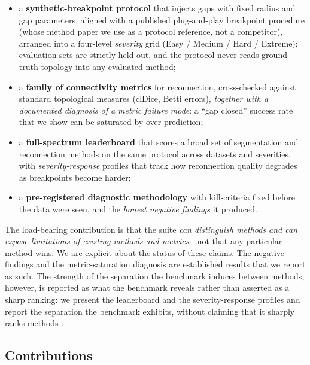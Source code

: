 \begin{itemize}
  \item a \textbf{synthetic-breakpoint protocol} that injects gaps with
        fixed radius and gap parameters, aligned with a published
        plug-and-play breakpoint procedure \cite{TODO_creatis} (whose method
        paper we use as a protocol reference, not a competitor), arranged
        into a four-level \emph{severity} grid (Easy / Medium / Hard /
        Extreme); evaluation sets are strictly held out, and the protocol
        never reads ground-truth topology into any evaluated method;
  \item a \textbf{family of connectivity metrics} for reconnection,
        cross-checked against standard topological measures (clDice, Betti
        errors), \emph{together with a documented diagnosis of a metric
        failure mode}: a ``gap closed'' success rate that we show can be
        saturated by over-prediction;
  \item a \textbf{full-spectrum leaderboard} that scores a broad set of
        segmentation and reconnection methods on the same protocol across
        datasets and severities, with \emph{severity-response} profiles that
        track how reconnection quality degrades as breakpoints become harder;
  \item a \textbf{pre-registered diagnostic methodology} with kill-criteria
        fixed before the data were seen, and the \emph{honest negative
        findings} it produced.
\end{itemize}

The load-bearing contribution is that the suite \emph{can distinguish methods
and can expose limitations of existing methods and metrics}---not that any
particular method wins. We are explicit about the status of these claims.
The negative findings and the metric-saturation diagnosis are established
results that we report as such. The strength of the separation the
benchmark induces between methods, however, is reported as what the
benchmark reveals rather than asserted as a sharp ranking: we present the
leaderboard and the severity-response profiles and report the separation the
benchmark exhibits, without claiming that it sharply ranks methods
.

\subsection{Contributions}
\label{sec:intro:contrib}

